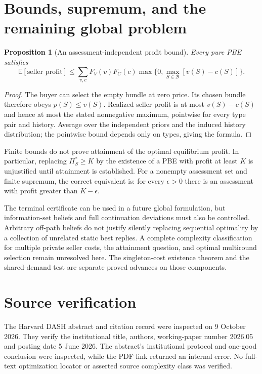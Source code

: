 \documentclass[11pt]{article}
\newtheorem{proposition}[theorem]{Proposition}
\theoremstyle{remark}
\newcommand{\E}{\mathbb E}
\begin{document}
\section{Bounds, supremum, and the remaining global problem}
\begin{proposition}[An assessment-independent profit bound]
Every pure PBE satisfies
\[
 \E[\text{seller profit}]
 \leq\sum_{v,c}F_V(v)F_C(c)
 \max\{0,\max_{S\in\mathcal B}[v(S)-c(S)]\}.
\]
\end{proposition}
\begin{proof}
The buyer can select the empty bundle at zero price. Its chosen bundle therefore obeys $p(S)\leq v(S)$. Realized seller profit is at most $v(S)-c(S)$ and hence at most the stated nonnegative maximum, pointwise for every type pair and history. Average over the independent priors and the induced history distribution; the pointwise bound depends only on types, giving the formula.
\end{proof}

Finite bounds do not prove attainment of the optimal equilibrium profit. In particular, replacing $\Pi_S^*\geq K$ by the existence of a PBE with profit at least $K$ is unjustified until attainment is established. For a nonempty assessment set and finite supremum, the correct equivalent is: for every $\epsilon>0$ there is an assessment with profit greater than $K-\epsilon$.

The terminal certificate can be used in a future global formulation, but information-set beliefs and full continuation deviations must also be controlled. Arbitrary off-path beliefs do not justify silently replacing sequential optimality by a collection of unrelated static best replies. A complete complexity classification for multiple private seller costs, the attainment question, and optimal multiround selection remain unresolved here. The singleton-cost existence theorem and the shared-demand test are separate proved advances on those components.

\section{Source verification}
The Harvard DASH abstract and citation record were inspected on 9 October 2026. They verify the institutional title, authors, working-paper number 2026.05 and posting date 5 June 2026. The abstract's institutional protocol and one-good conclusion were inspected, while the PDF link returned an internal error. No full-text optimization locator or asserted source complexity class was verified.
\end{document}
